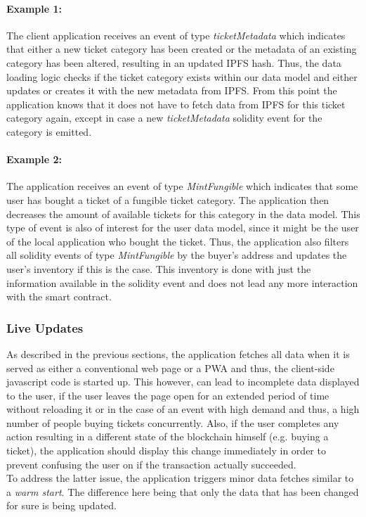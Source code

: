 \paragraph{Example 1:} The client application receives an event of type \textit{ticketMetadata} which indicates that either a new ticket category has been created or the metadata of an existing category has been altered, resulting in an updated IPFS hash. Thus, the data loading logic checks if the ticket category exists within our data model and either updates or creates it with the new metadata from IPFS. From this point the application knows that it does not have to fetch data from IPFS for this ticket category again, except in case a new \textit{ticketMetadata} solidity event for the category is emitted. 

\paragraph{Example 2:} The application receives an event of type \textit{MintFungible} which indicates that some user has bought a ticket of a fungible ticket category. The application then decreases the amount of available tickets for this category in the data model. This type of event is also of interest for the user data model, since it might be the user of the local application who bought the ticket. Thus, the application also filters all solidity events of type \textit{MintFungible} by the buyer's address and updates the user's inventory if this is the case. This inventory is done with just the information available in the solidity event and does not lead any more interaction with the smart contract.

\subsubsection{Live Updates}

As described in the previous sections, the application fetches all data when it is served as either a conventional web page or a PWA and thus, the client-side javascript code is started up. This however, can lead to incomplete data displayed to the user, if the user leaves the page open for an extended period of time without reloading it or in the case of an event with high demand and thus, a high number of people buying tickets concurrently. Also, if the user completes any action resulting in a different state of the blockchain himself (e.g. buying a ticket), the application should display this change immediately in order to prevent confusing the user on if the transaction actually succeeded. 
\\
To address the latter issue, the application triggers minor data fetches similar to a \textit{warm start}. The difference here being that only the data that has been changed for sure is being updated.

